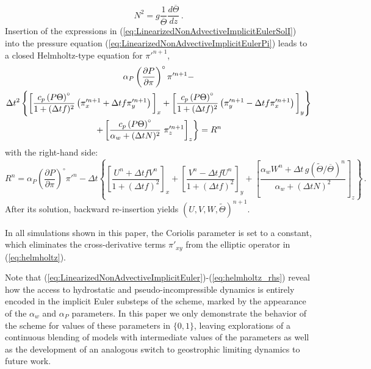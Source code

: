 \documentclass{ametsoc}
\theoremstyle{definition}
\newcommand{\eq}[1]{(\ref{#1})}
\newcommand{\dt}{\Delta t}
\newcommand{\Thetabar}{\overline{\Theta}}
\newcommand{\Thetatilde}{{\widetilde \Theta}}
\newcommand{\ahydro}{\alpha_{w}}
\newcommand{\apsinc}{\alpha_{P}}
\begin{document}
%
\begin{equation}
N^2 = g \frac{1}{\Thetabar}\frac{d\Thetabar}{dz}\,.
\end{equation}
%
Insertion of the expressions in \eq{eq:LinearizedNonAdvectiveImplicitEulerSolI}
into the pressure equation \eq{eq:LinearizedNonAdvectiveImplicitEulerPi} 
leads to a closed Helmholtz-type equation for ${\pi'}^{n+1}$, 
%
 \begin{multline}\label{eq:helmholtz}
 \apsinc \left(\dfrac{\partial P}{\partial\pi}\right)^{\circ}\pi'^{n+1} - \\
\dt^2 
\left\{ 
      \left[
        \dfrac{c_p \left(P\Theta\right)^{\circ}}{1+(\dt f)^2} 
          \left(\pi'^{n+1}_x+\dt f\pi'^{n+1}_y
          \right)
        \rule{0pt}{12pt}\right]_x
       +\left[
          \dfrac{c_p \left(P\Theta\right)^{\circ}}{1+(\dt f)^2} 
            \left(\pi'^{n+1}_y-\dt f\pi'^{n+1}_x
            \right)
         \rule{0pt}{12pt}\right]_y
      \right\}
    \\
    \left.
  + \left[\dfrac{c_p \left(P\Theta\right)^{\circ}}{\ahydro + (\dt N)^2} \ \pi'^{n+1}_z
      \rule{0pt}{12pt}\right]_z
    \right\}
  = R^n
 \end{multline}
%
with the right-hand side:
%
\begin{equation}\label{eq:helmholtz_rhs}
R^n= \apsinc \left(\dfrac{\partial P}{\partial\pi}\right)^{\circ}\pi'^n-
\dt
\left\{
\left[\dfrac{U^n +\dt f V^n}{1+(\dt f)^2}\right]_x  
+ \left[\dfrac{V^n - \dt f U^n}{1+(\dt f)^2}\right]_y
+\left[\dfrac{\ahydro W^n+\dt\, g\left(\Thetatilde/\Thetabar\right)^n}{\ahydro+(\dt N)^2}\right]_z\right\} \,.
\end{equation}
%
After its solution, backward re-insertion yields $(U, V, W, \Thetatilde)^{n+1}$.

In all simulations shown in this paper, the Coriolis parameter is set to a
constant, which eliminates the cross-derivative terms $\pi'_{xy}$ from
the elliptic operator in \eq{eq:helmholtz}.

Note that \eq{eq:LinearizedNonAdvectiveImplicitEuler}-\eq{eq:helmholtz_rhs}
reveal how the access to hydrostatic and pseudo-incompressible dynamics is entirely
encoded in the implicit Euler substeps of the scheme, marked by the appearance of 
the $\ahydro$ and $\apsinc$ parameters. In this paper we only demonstrate the behavior 
of the scheme for values of these parameters in $\{0,1\}$, leaving explorations of 
a continuous blending of models with intermediate values of the parameters as well as the development of an analogous switch to geostrophic limiting dynamics to future 
work.
\end{document}
